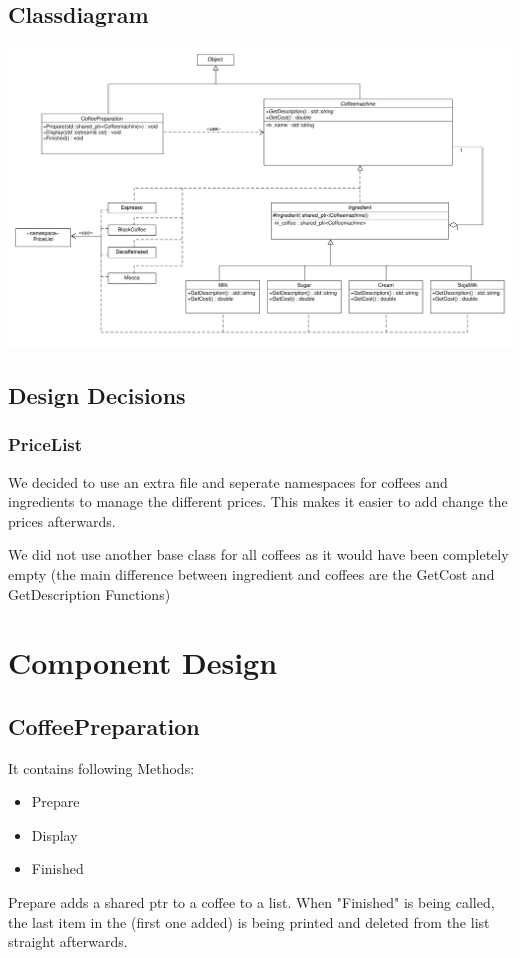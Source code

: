 \subsection{Classdiagram}
\includegraphics[scale=0.50, angle=90]{../ClassDiagram.pdf}

\subsection{Design Decisions}
\subsubsection{PriceList}
We decided to use an extra file and seperate namespaces for coffees and ingredients to manage the different prices. This makes it easier to add change the prices afterwards.

We did not use another base class for all coffees as it would have been completely empty (the main difference between ingredient and coffees are the GetCost and GetDescription Functions)

\section{Component Design}
\subsection{CoffeePreparation}
It contains following Methods:
\begin{itemize}
	\item Prepare
	\item Display
	\item Finished
\end{itemize}

Prepare adds a shared ptr to a coffee to a list. When "Finished" is being called, the last item in the (first one added) is being printed and deleted from the list straight afterwards.

